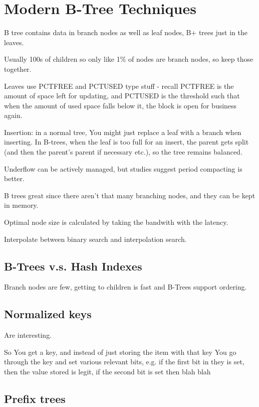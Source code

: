 \documentclass{article}
\begin{document}
\newpage
\section{Modern B-Tree Techniques}

	B tree contains data in branch nodes as well as leaf nodes, B+ trees just in the leaves.
	
	Usually 100s of children so only like 1\% of nodes are branch nodes, so keep those together.
	
	Leaves use PCTFREE and PCTUSED type stuff - recall PCTFREE is the amount of space left for updating, and PCTUSED is the threshold such that when the amount of used space falls below it, the block is open for business again.

	Insertion: in a normal tree, You might just replace a leaf with a branch when inserting. In B-trees, when the leaf is too full for an insert, the parent gets split (and then the parent's parent if necessary etc.), so the tree remains balanced.
	
	Underflow can be actively managed, but studies suggest period compacting is better.
	
	B trees great since there aren't that many branching nodes, and they can be kept in memory.
	
	Optimal node size is calculated by taking the bandwith with the latency.
	
	Interpolate between binary search and interpolation search.
	
	\subsection{B-Trees v.s. Hash Indexes}
	
		Branch nodes are few, getting to children is fast and B-Trees support ordering.
		
	\subsection{Normalized keys}
	
		Are interesting.
		
		So You get a key, and instead of just storing the item with that key You go through the key and set various relevant bits, e.g. if the first bit in they is set, then the value stored is legit, if the second bit is set then blah blah
		
	\subsection{Prefix trees}
	
\end{document}
